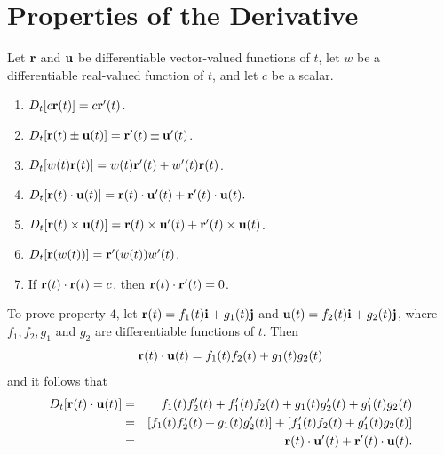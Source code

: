 \documentclass[titlepage,a4paper,12pt]{report}
\begin{document}
\section{Properties of the Derivative}
Let ${\bf{r}}$ and ${\bf{u}}$ be differentiable vector-valued functions of $t$, let $w$ be a differentiable real-valued function of $t$, and let $c$ be a scalar.
\begin{enumerate}
\item $D_t[c{\bf{r}}(t)]=c{\bf{r}}'(t)$.
\item $D_t[{\bf{r}}(t)\pm {\bf{u}}(t)]={\bf{r}}'(t) \pm {\bf{u}}'(t)$.
\item $D_t[w(t){\bf{r}}(t)]=w(t){\bf{r}}'(t)+w'(t){\bf{r}}(t)$.
\item $D_t[{\bf{r}}(t)\cdot {\bf{u}}(t)]={\bf{r}}(t) \cdot {\bf{u}}'(t)+{\bf{r}}'(t)\cdot {\bf{u}}(t).$
\item $D_t[{\bf{r}}(t) \times {\bf{u}}(t)]= {\bf{r}}(t)\times {\bf{u}}'(t) +{\bf{r}}'(t)\times {\bf{u}}(t)$.
\item $D_t[{\bf{r}}(w(t))]={\bf{r}}'(w(t))w'(t)$.
\item If ${\bf{r}}(t)\cdot {\bf{r}}(t)=c$, then ${\bf{r}}(t)\cdot {\bf{r}}'(t)=0$.
\end{enumerate}
To prove property $4$, let ${\bf{r}}(t)=f_1(t){\bf{i}}+g_1(t){\bf{j}}$ and  ${\bf{u}}(t)=f_2(t){\bf{i}}+g_2(t){\bf{j}}$, where $f_1, f_2, g_1$ and $g_2$ are differentiable functions of $t$. Then 
\[{\bf{r}}(t) \cdot {\bf{u}}(t)=f_1(t)f_2(t)+g_1(t)g_2(t)\] and it follows that 
\begin{eqnarray*}
D_t[{\bf{r}}(t) \cdot {\bf{u}}(t)] &=& f_1(t)f_2'(t) +f_1'(t)f_2(t) +g_1(t)g_2'(t)+g_1'(t)g_2(t)\\
&=&[f_1(t)f_2'(t)+g_1(t)g_2'(t)] +[f_1'(t)f_2(t)+g_1'(t)g_2(t)]\\
&=& {\bf{r}}(t)\cdot {\bf{u}}'(t) +{\bf{r}}'(t) \cdot {\bf{u}}(t).
\end{eqnarray*} 
\end{document}
